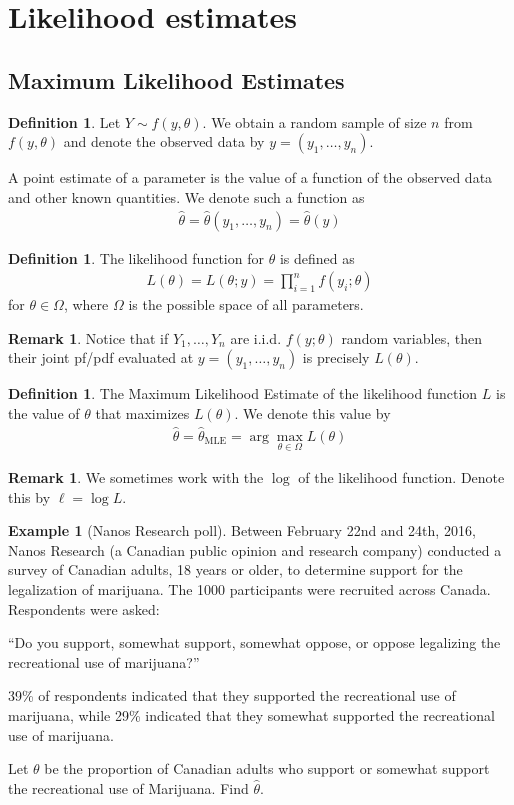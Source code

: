 \documentclass[11pt]{amsart}
\theoremstyle{definition}
\newtheorem{definition}[theorem]{Definition}
\newtheorem{remark}[theorem]{Remark}
\newtheorem{example}[theorem]{Example}
\numberwithin{equation}{section}
\begin{document}
\section{Likelihood estimates}
\subsection{Maximum Likelihood Estimates}
\begin{definition}
    Let $Y\sim f(y,\theta)$. We obtain a random sample of size $n$ from $f(y,\theta)$ and denote the observed data by $y=(y_1,\ldots,y_n)$.

    A point estimate of a parameter is the value of a function of the observed data and other known quantities. We denote such a function as 
    \begin{align*}
        \hat{\theta}=\hat{\theta}(y_1,\ldots,y_n)=\hat\theta(y)
    \end{align*}
\end{definition}
\begin{definition}
    The likelihood function for $\theta$ is defined as 
    \begin{align*}
        L(\theta)=L(\theta;y)=\prod_{i=1}^nf(y_i;\theta)
    \end{align*}
    for $\theta\in\Omega$, where $\Omega$ is the possible space of all parameters.
\end{definition}
\begin{remark}
    Notice that if $Y_1,\ldots,Y_n$ are i.i.d. $f(y;\theta)$ random variables, then their joint pf/pdf evaluated at $y=(y_1,\ldots,y_n)$ is precisely $L(\theta)$.
\end{remark}
\begin{definition}
    The Maximum Likelihood Estimate of the likelihood function $L$ is the value of $\theta$ that maximizes $L(\theta)$. We denote this value by
    \begin{align*}
        \hat{\theta}=\hat{\theta}_{\mathrm{MLE}}=\arg\max_{\theta\in\Omega}L(\theta)
    \end{align*}
\end{definition}
\begin{remark}
    We sometimes work with the $\log$ of the likelihood function. Denote this by $\ell=\log L$.
\end{remark}
\begin{example}[Nanos Research poll]
    Between February 22nd and 24th, 2016, Nanos Research (a Canadian public opinion and research company) conducted a survey of Canadian adults, 18 years or older, to determine support for the legalization of marijuana. The 1000 participants were recruited across Canada. Respondents were asked:
    
    “Do you support, somewhat support, somewhat oppose, or oppose legalizing the recreational use of marijuana?”

    39\% of respondents indicated that they supported the recreational use of marijuana, while 29\% indicated that they somewhat supported the recreational use of marijuana.

    Let $\theta$ be the proportion of Canadian adults who support or somewhat support the recreational use of Marijuana. Find $\hat\theta$.
\end{example}
\end{document}
